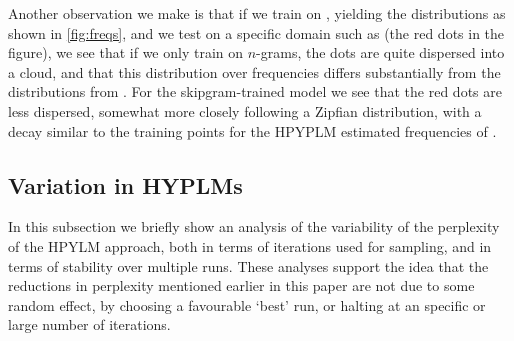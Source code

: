 Another observation we make is that if we train on \obw, yielding the distributions as shown in \cref{fig:freqs}, and we test on a specific domain such as \jrc (the red dots in the figure), we see that if we only train on $n$-grams, the dots are quite dispersed into a cloud, and that this distribution over frequencies differs substantially from the distributions from \obw. For the skipgram-trained model we see that the red dots are less dispersed, somewhat more closely following a Zipfian distribution, with a decay similar to the training points for the HPYPLM estimated frequencies of \obw.

\subsection{Variation in HYPLMs}
In this subsection we briefly show an analysis of the variability of the perplexity of the HPYLM approach, both in terms of iterations used for sampling, and in terms of stability over multiple runs. These analyses support the idea that the reductions in perplexity mentioned earlier in this paper are not due to some random effect, by choosing a favourable `best' run, or halting at an specific or large number of iterations.



